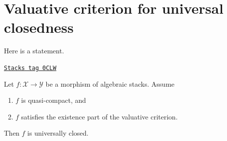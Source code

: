 \section{Valuative criterion for universal closedness}
\label{stacks-morphisms-section-valutive-criterion}
Here is a statement.

\begin{lemma}
\label{stacks-morphisms-lemma-quasi-compact-existence-universally-closed}
\href{https://stacks.math.columbia.edu/tag/0CLW}{\texttt{Stacks tag 0CLW}}

Let $f : \mathcal{X} \to \mathcal{Y}$ be a morphism of algebraic stacks.
Assume
\begin{enumerate}
\item $f$ is quasi-compact, and
\item $f$ satisfies the existence part of the valuative criterion.
\end{enumerate}
Then $f$ is universally closed.
\end{lemma}

